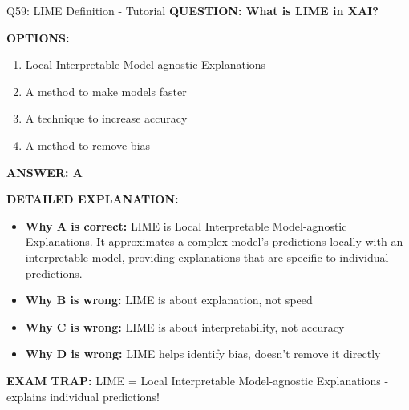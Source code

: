\documentclass[8pt]{beamer}
\begin{document}
	\begin{frame}{Q59: LIME Definition - Tutorial}
		\fontsize{6.5}{7.5}\selectfont
		\textbf{QUESTION: What is LIME in XAI?}
		
		\vspace{0.1cm}
		\textbf{OPTIONS:}
		\begin{enumerate}
			\item Local Interpretable Model-agnostic Explanations
			\item A method to make models faster
			\item A technique to increase accuracy
			\item A method to remove bias
		\end{enumerate}
		
		\vspace{0.1cm}
		\textcolor{myblue}{\textbf{ANSWER: A}}
		
		\vspace{0.1cm}
		\textbf{DETAILED EXPLANATION:}
		\begin{itemize}
			\item \textbf{Why A is correct:} LIME is Local Interpretable Model-agnostic Explanations. It approximates a complex model's predictions locally with an interpretable model, providing explanations that are specific to individual predictions.
			\item \textbf{Why B is wrong:} LIME is about explanation, not speed
			\item \textbf{Why C is wrong:} LIME is about interpretability, not accuracy
			\item \textbf{Why D is wrong:} LIME helps identify bias, doesn't remove it directly
		\end{itemize}
		
		\textcolor{myred}{\textbf{EXAM TRAP:}} LIME = \textcolor{myblue}{Local Interpretable Model-agnostic Explanations} - explains individual predictions!
	\end{frame}
	
\end{document}
